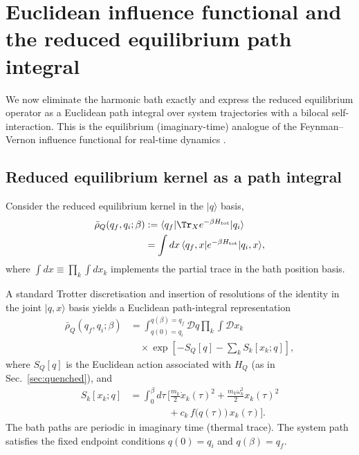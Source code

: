 \section{Euclidean influence functional and the reduced equilibrium path integral}
\label{sec:influence}
We now eliminate the harmonic bath exactly and express the reduced equilibrium
operator as a Euclidean path integral over system trajectories with a bilocal
self-interaction. This is the equilibrium (imaginary-time) analogue of the
Feynman--Vernon influence functional for real-time dynamics
\cite{feynmanTheoryGeneralQuantum1963a,caldeiraQuantumTunnellingDissipative1983a,grabertQuantumBrownianMotion1988}.

\subsection{Reduced equilibrium kernel as a path integral}

Consider the reduced equilibrium kernel in the $|q\rangle$ basis,
\begin{equation}
\begin{split}
    \bar\rho_Q(q_f,q_i;\beta)
    &:=
    \langle q_f|\Tr_X e^{-\beta H_{\mathrm{tot}}}|q_i\rangle \\
    &=
    \int dx\, \langle q_f,x|e^{-\beta H_{\mathrm{tot}}}|q_i,x\rangle,
\end{split}
    \label{eq:reduced_kernel_again}
\end{equation}
where $\int dx\equiv \prod_k\int dx_k$ implements the partial trace in the bath
position basis.

A standard Trotter discretisation and insertion of resolutions of the identity
in the joint $|q,x\rangle$ basis yields a Euclidean path-integral representation
\begin{align}
    \bar\rho_Q(q_f,q_i;\beta)
    &=
    \int_{q(0)=q_i}^{q(\beta)=q_f}\!\!\mathcal D q
    \prod_k \int \mathcal D x_k\; \nonumber\\
    &\quad \times
    \exp\!\left[-S_Q[q] - \sum_k S_k[x_k;q]\right],
    \label{eq:full_euclidean_PI}
\end{align}
where $S_Q[q]$ is the Euclidean action associated with $H_Q$ (as in
Sec.~\ref{sec:quenched}), and
\begin{equation}
\begin{split}
    S_k[x_k;q]
    &=
    \int_0^\beta d\tau\,
    \bigg[
        \frac{m_k}{2}\dot x_k(\tau)^2
        +\frac{m_k\omega_k^2}{2}x_k(\tau)^2 \\
        &\qquad\qquad+ c_k\, f\!\big(q(\tau)\big)\, x_k(\tau)
    \bigg].
\end{split}
    \label{eq:bath_action}
\end{equation}
The bath paths are periodic in imaginary time (thermal trace). The system path
satisfies the fixed endpoint conditions $q(0)=q_i$ and $q(\beta)=q_f$.

